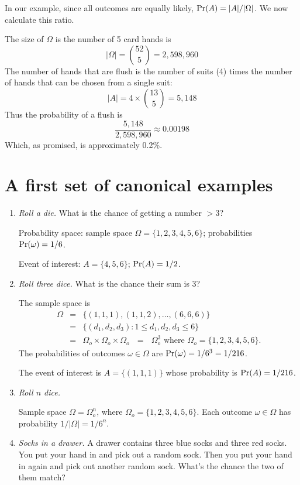 In our example, since all outcomes are equally likely, $\mbox{\rm Pr}(A) =
|A|/|\Omega|$. We now calculate this ratio.

The size of $\Omega$ is the number of 5 card hands is 
$$ |\Omega| = {52 \choose 5} = 2,598,960$$
The number of hands that are flush is the
number of suits (4) times the number of hands that can be chosen from
a single suit: 
$$|A|= 4\times {13 \choose 5} = 5,148$$ 
Thus the probability of a flush is
$$\frac{5,148}{2,598,960} \approx 0.00198$$
Which, as promised, is approximately 0.2\%.

\section{A first set of canonical examples}

\begin{enumerate}
\item {\it Roll a die.} What is the chance of getting a number $> 3$?

Probability space: sample space $\Omega = \{1,2,3,4,5,6\}$; probabilities $\mbox{\rm Pr}(\omega) = 1/6$.

Event of interest: $A = \{4,5,6\}$; $\mbox{\rm Pr}(A) = 1/2$.

\item {\it Roll three dice.} What is the chance their sum is 3?

The sample space is 
\begin{eqnarray*}
\Omega 
& = & \{(1,1,1), (1,1,2), \ldots, (6,6,6)\} \\
& = & \{(d_1, d_2, d_3): 1 \leq d_1, d_2, d_3 \leq 6\} \\
& = & \Omega_o \times \Omega_o \times \Omega_o 
\ \ \ = \ \ \ \Omega_o^3 \mbox{\ \ \ \ where\ } \Omega_o = \{1,2,3,4,5,6\}.
\end{eqnarray*}
The probabilities of outcomes $\omega \in \Omega$ are $\mbox{\rm Pr}(\omega) = 1/6^3 = 1/216$.

The event of interest is $A = \{(1,1,1)\}$ whose probability is $\mbox{\rm Pr}(A) = 1/216$.

\item {\it Roll $n$ dice.}

Sample space $\Omega = \Omega_o^n$, where $\Omega_o = \{1,2,3,4,5,6\}$. Each outcome $\omega \in \Omega$ has probability $1/|\Omega| = 1/6^n$.

\item {\it Socks in a drawer.} A drawer contains three blue socks and three red socks. You put your hand in and pick out a random sock. Then you put your hand in again and pick out another random sock. What's the chance the two of them match?


\end{enumerate}
